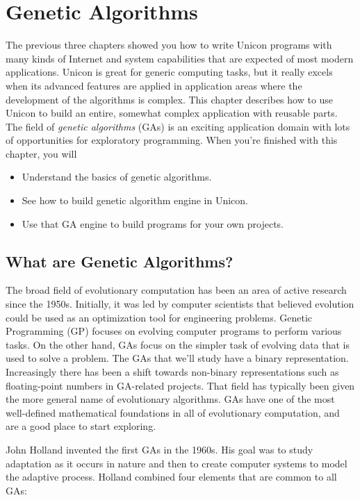 \chapter{Genetic Algorithms}

The previous three chapters showed you how to write Unicon programs with
many kinds of Internet and system capabilities that are expected of
most modern applications. Unicon is great for generic computing tasks,
but it really excels when its advanced features are applied in
application areas where the development of the algorithms is complex.
This chapter describes how to use Unicon to build an entire, somewhat
complex application with reusable parts. The field of \textit{genetic algorithms} (GAs) is an exciting application
domain with lots of opportunities for exploratory programming. When
you're finished with this chapter, you will
\begin{itemize}
\item Understand the basics of genetic algorithms.
\item See how to build genetic algorithm engine in Unicon.
\item Use that GA engine to build programs for your own projects.
\end{itemize}

\section{What are Genetic Algorithms?}

The broad field of evolutionary computation has been an area of active
research since the 1950s. Initially, it was led by computer scientists
that believed evolution could be used as an optimization tool for
engineering problems. Genetic Programming (GP) focuses on evolving
computer programs to perform various tasks. On the other hand, GAs
focus on the simpler task of evolving data that is used to solve a
problem. The GAs that we'll study have a binary
representation. Increasingly there has been a shift towards non-binary
representations such as floating-point numbers in GA-related projects.
That field has typically been given the more general name of
evolutionary algorithms. GAs have one of the most well-defined
mathematical foundations in all of evolutionary computation, and are a
good place to start exploring.

John Holland invented the first GAs in the 1960s. His goal was to study
adaptation as it occurs in nature and then to create computer systems
to model the adaptive process. Holland combined four elements that are
common to all GAs:

